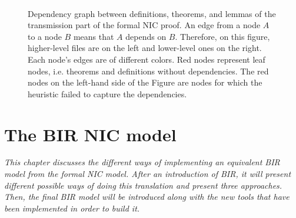 \documentclass{kththesis}
\begin{document}
{\begin{figure}[p]
	\includegraphics[width=\textwidth]{figures/depgraph-nic-tx-thms.pdf}
	\centering
	\caption{Dependency graph between definitions, theorems, and lemmas of the transmission part of the formal NIC proof. An edge from a node $A$ to a node $B$ means that $A$ depends on $B$. Therefore, on this figure, higher-level files are on the left and lower-level ones on the right. Each node's edges are of different colors. Red nodes represent leaf nodes, i.e. theorems and definitions without dependencies. The red nodes on the left-hand side of the Figure are nodes for which the heuristic failed to capture the dependencies.}
	\label{depgraph-nic-tx-thms}
\end{figure}

\chapter{The BIR NIC model} \label{nic-model}
\vspace{-1cm}
\textit{This chapter discusses the different ways of implementing an equivalent BIR model from the formal NIC model. After an introduction of BIR, it will present different possible ways of doing this translation and present three approaches. Then, the final BIR model will be introduced along with the new tools that have been implemented in order to build it.}

}
\end{document}
